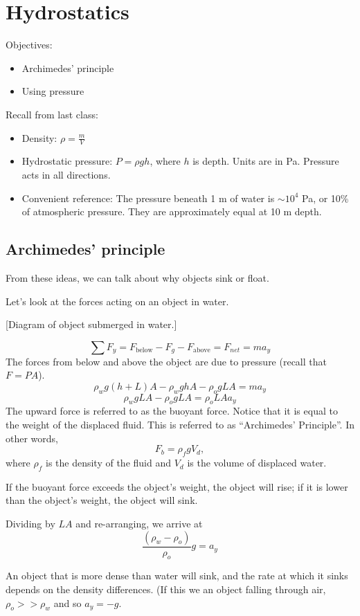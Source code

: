 \section{Hydrostatics}
Objectives:
\begin{itemize}
\item Archimedes' principle
  \item Using pressure
\end{itemize}

Recall from last class:
\begin{itemize}
\item Density: $\rho=\frac{m}{V}$
\item Hydrostatic pressure: $P=\rho gh$, where $h$ is depth. Units are in Pa. Pressure acts in all directions.
\item Convenient reference: The pressure beneath 1 m of water is $\sim 10^4$ Pa, or 10\% of atmospheric pressure. They are approximately equal at 10 m depth.
\end{itemize}

\subsection{Archimedes' principle}
From these ideas, we can talk about why objects sink or float.

Let's look at the forces acting on an object in water. 

[Diagram of object submerged in water.]\nopagebreak
\vspace{5cm}

$$\sum F_y=F_{\mbox{below}}-F_g-F_{\mbox{above}}=F_{net}=ma_y$$
The forces from below and above the object are due to pressure (recall that $F=PA$).
$$\rho_w g(h+L)A-\rho_w ghA-\rho_o gLA=ma_y$$
$$\rho_w gLA-\rho_o gLA=\rho_oLAa_y$$
The upward force is referred to as the buoyant force. Notice that it is equal to the weight of the displaced fluid. This is referred to as ``Archimedes' Principle''. In other words,
$$F_b = \rho_fgV_d,$$
where $\rho_f$ is the density of the fluid and $V_d$ is the volume of displaced water.

If the buoyant force exceeds the object's weight, the object will rise; if it is lower than the object's weight, the object will sink. 

Dividing by $LA$ and re-arranging, we arrive at
$$\frac{(\rho_w-\rho_o)}{\rho_o}g=a_y$$

An object that is more dense than water will sink, and the rate at which it sinks depends on the density differences. (If this we an object falling through air, $\rho_o>>\rho_w$ and so $a_y=-g$.

